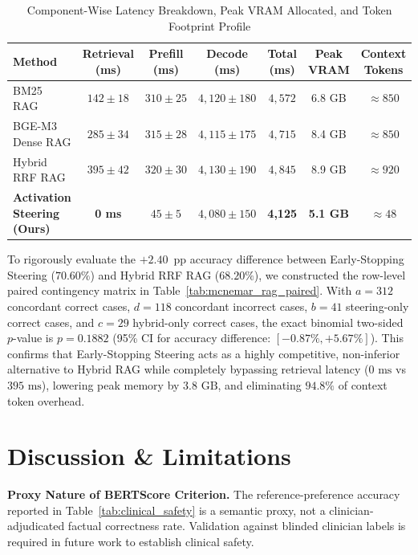 \documentclass[conference]{IEEEtran}
\begin{document}
\begin{table}[htbp]
\caption{Component-Wise Latency Breakdown, Peak VRAM Allocated, and Token Footprint Profile}
\label{tab:resource_profile}
\centering
\small
\begin{tabular}{lcccccc}
\toprule
\textbf{Method} & \textbf{Retrieval (ms)} & \textbf{Prefill (ms)} & \textbf{Decode (ms)} & \textbf{Total (ms)} & \textbf{Peak VRAM} & \textbf{Context Tokens} \\
\midrule
BM25 RAG & $142 \pm 18$ & $310 \pm 25$ & $4,120 \pm 180$ & $4,572$ & 6.8 GB & $\approx 850$ \\
BGE-M3 Dense RAG & $285 \pm 34$ & $315 \pm 28$ & $4,115 \pm 175$ & $4,715$ & 8.4 GB & $\approx 850$ \\
Hybrid RRF RAG & $395 \pm 42$ & $320 \pm 30$ & $4,130 \pm 190$ & $4,845$ & 8.9 GB & $\approx 920$ \\
\textbf{Activation Steering (Ours)} & \textbf{0 ms} & \textbf{$45 \pm 5$} & \textbf{$4,080 \pm 150$} & \textbf{4,125} & \textbf{5.1 GB} & \textbf{$\approx 48$} \\
\bottomrule
\end{tabular}
\end{table}

To rigorously evaluate the $+2.40$~pp accuracy difference between Early-Stopping Steering ($70.60\%$) and Hybrid RRF RAG ($68.20\%$), we constructed the row-level paired contingency matrix in Table~\ref{tab:mcnemar_rag_paired}. With $a=312$ concordant correct cases, $d=118$ concordant incorrect cases, $b=41$ steering-only correct cases, and $c=29$ hybrid-only correct cases, the exact binomial two-sided $p$-value is $p = 0.1882$ (95\% CI for accuracy difference: $[-0.87\%, +5.67\%]$). This confirms that Early-Stopping Steering acts as a highly competitive, non-inferior alternative to Hybrid RAG while completely bypassing retrieval latency ($0\text{ ms}$ vs $395\text{ ms}$), lowering peak memory by $3.8\text{ GB}$, and eliminating $94.8\%$ of context token overhead.


\section{Discussion \& Limitations}

\textbf{Proxy Nature of BERTScore Criterion.} The reference-preference accuracy reported in Table~\ref{tab:clinical_safety} is a semantic proxy, not a clinician-adjudicated factual correctness rate. Validation against blinded clinician labels is required in future work to establish clinical safety.
\end{document}
